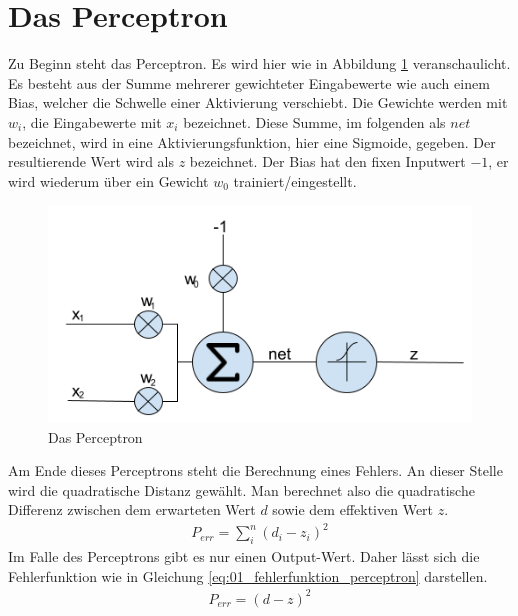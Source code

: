 \section{Das Perceptron}
Zu Beginn steht das Perceptron. Es wird hier wie in Abbildung \ref{fig:04_perceptron} veranschaulicht.
Es besteht aus der Summe mehrerer gewichteter Eingabewerte wie auch einem Bias, welcher
die Schwelle einer Aktivierung verschiebt. Die Gewichte werden mit $w_i$, die Eingabewerte mit $x_i$ bezeichnet.
Diese Summe, im folgenden als $net$ bezeichnet, wird in eine Aktivierungsfunktion,
hier eine Sigmoide, gegeben. Der resultierende Wert wird als $z$ bezeichnet. Der Bias hat den fixen Inputwert $-1$,
er wird wiederum über ein Gewicht $w_0$ trainiert/eingestellt.

\begin{figure}[h!]
    \begin{center}
        \includegraphics[width=0.6\linewidth]{../common/01_neuronal_network/00_resources/00_perceptron.png}
    \end{center}
    \caption{Das Perceptron}
    \label{fig:04_perceptron}
\end{figure}

Am Ende dieses Perceptrons steht die Berechnung eines Fehlers. An dieser Stelle wird die quadratische Distanz gewählt.
Man berechnet also die quadratische Differenz zwischen dem erwarteten Wert $d$ sowie dem effektiven Wert $z$.
\begin{align}
    P_{err} = \sum_i^n(d_i - z_i)^2
\end{align}
Im Falle des Perceptrons gibt es nur einen Output-Wert. Daher lässt sich die Fehlerfunktion wie in Gleichung \ref{eq:01_fehlerfunktion_perceptron}
darstellen.
\begin{align}
    P_{err} = (d - z)^2\label{eq:01_fehlerfunktion_perceptron}
\end{align}

